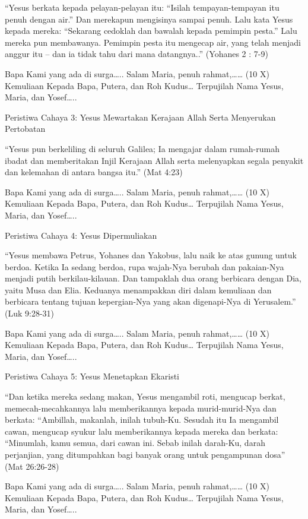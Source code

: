 \documentclass[a5paper,headsepline,titlepage,11pt,nnormalheadings,DIVcalc]{scrbook}
\begin{document}
“Yesus berkata kepada pelayan-pelayan itu: “Isilah tempayan-tempayan itu penuh dengan air.” Dan merekapun mengisinya sampai penuh. Lalu kata Yesus kepada mereka: “Sekarang cedoklah dan bawalah kepada pemimpin pesta.” Lalu mereka pun membawanya. Pemimpin pesta itu mengecap air, yang telah menjadi anggur itu – dan ia tidak tahu dari mana datangnya..” (Yohanes 2 : 7-9)

Bapa Kami yang ada di surga…..
Salam Maria, penuh rahmat,…… (10 X)
Kemuliaan Kepada Bapa, Putera, dan Roh Kudus…
Terpujilah Nama Yesus, Maria, dan Yosef…..

	Peristiwa Cahaya 3: Yesus Mewartakan Kerajaan Allah Serta Menyerukan Pertobatan

“Yesus pun berkeliling di seluruh Galilea; Ia mengajar dalam rumah-rumah ibadat dan memberitakan Injil Kerajaan Allah serta melenyapkan segala penyakit dan kelemahan di antara bangsa itu.” (Mat 4:23)

Bapa Kami yang ada di surga…..
Salam Maria, penuh rahmat,…… (10 X)
Kemuliaan Kepada Bapa, Putera, dan Roh Kudus…
Terpujilah Nama Yesus, Maria, dan Yosef…..

	Peristiwa Cahaya 4: Yesus Dipermuliakan

“Yesus membawa Petrus, Yohanes dan Yakobus, lalu naik ke atas gunung untuk berdoa. Ketika Ia sedang berdoa, rupa wajah-Nya berubah dan pakaian-Nya menjadi putih berkilau-kilauan. Dan tampaklah dua orang berbicara dengan Dia, yaitu Musa dan Elia. Keduanya menampakkan diri dalam kemuliaan dan berbicara tentang tujuan kepergian-Nya yang akan digenapi-Nya di Yerusalem.” (Luk 9:28-31)

Bapa Kami yang ada di surga…..
Salam Maria, penuh rahmat,…… (10 X)
Kemuliaan Kepada Bapa, Putera, dan Roh Kudus…
Terpujilah Nama Yesus, Maria, dan Yosef…..

	Peristiwa Cahaya 5: Yesus Menetapkan Ekaristi

“Dan ketika mereka sedang makan, Yesus mengambil roti, mengucap berkat, memecah-mecahkannya lalu memberikannya kepada murid-murid-Nya dan berkata: “Ambillah, makanlah, inilah tubuh-Ku. Sesudah itu Ia mengambil cawan, mengucap syukur lalu memberikannya kepada mereka dan berkata: “Minumlah, kamu semua, dari cawan ini. Sebab inilah darah-Ku, darah perjanjian, yang ditumpahkan bagi banyak orang untuk pengampunan dosa” (Mat 26:26-28)

Bapa Kami yang ada di surga…..
Salam Maria, penuh rahmat,…… (10 X)
Kemuliaan Kepada Bapa, Putera, dan Roh Kudus…
Terpujilah Nama Yesus, Maria, dan Yosef…..
\end{document}
